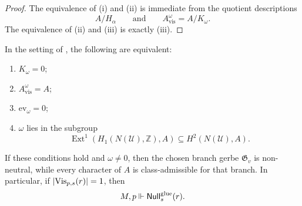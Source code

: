 \begin{proof}
The equivalence of \textup{(i)} and \textup{(ii)} is immediate from the quotient descriptions
\[
A/H_\alpha
\qquad\text{and}\qquad
A_{\mathrm{vis}}^{\omega}=A/K_{\omega}.
\]
The equivalence of \textup{(ii)} and \textup{(iii)} is exactly (iii).
\end{proof}

\begin{proposition}\label{thm:character-blind-obstructions}
In the setting of , the following are equivalent:
\begin{enumerate}[label=(\roman*),nosep]
\item $K_{\omega}=0$;
\item $A_{\mathrm{vis}}^{\omega}=A$;
\item $\mathrm{ev}_{\omega}=0$;
\item $\omega$ lies in the subgroup
\[
\operatorname{Ext}^1(H_1(N(\mathcal U),\mathbb Z),A)\subseteq H^2(N(\mathcal U),A).
\]
\end{enumerate}
If these conditions hold and $\omega\neq 0$, then the chosen branch gerbe $\mathfrak G_v$ is non-neutral, while every character of $A$ is class-admissible for that branch. In particular, if $|\mathrm{Vis}_{p,s}(r)|=1$, then
\[
M,p\Vdash \mathsf{Null}^{\mathrm{glue}}_s(r).
\]
\end{proposition}

